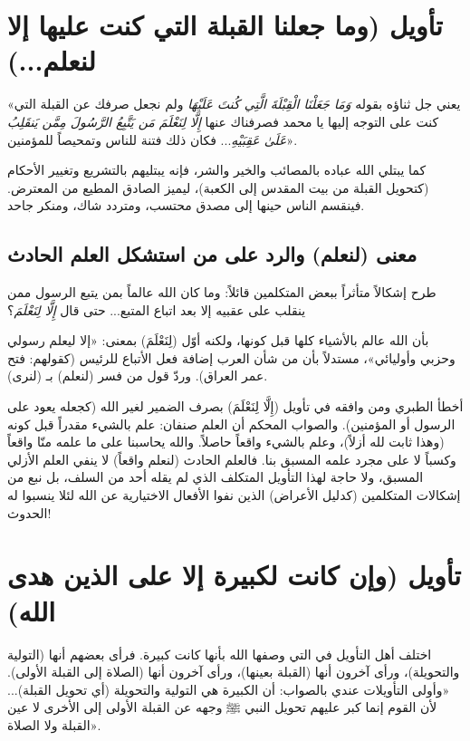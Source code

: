 \separator

\section{تأويل (وما جعلنا القبلة التي كنت عليها إلا لنعلم...)}
 «يعني جل ثناؤه بقوله \textit{وَمَا جَعَلْنَا الْقِبْلَةَ الَّتِي كُنتَ عَلَيْهَا} ولم نجعل صرفك عن القبلة التي كنت على التوجه إليها يا محمد فصرفناك عنها \textit{إِلَّا لِنَعْلَمَ مَن يَتَّبِعُ الرَّسُولَ مِمَّن يَنقَلِبُ عَلَىٰ عَقِبَيْهِ}... فكان ذلك فتنة للناس وتمحيصاً للمؤمنين».

\begin{fawaid}
كما يبتلي الله عباده بالمصائب والخير والشر، فإنه يبتليهم بالتشريع وتغيير الأحكام (كتحويل القبلة من بيت المقدس إلى الكعبة)، ليميز الصادق المطيع من المعترض. فينقسم الناس حينها إلى مصدق محتسب، ومتردد شاك، ومنكر جاحد.
\end{fawaid}

\subsection{معنى (لنعلم) والرد على من استشكل العلم الحادث}
طرح  إشكالاً متأثراً ببعض المتكلمين قائلاً:  وما كان الله عالماً بمن يتبع الرسول ممن ينقلب على عقبيه إلا بعد اتباع المتبع... حتى قال \textit{إِلَّا لِنَعْلَمَ}؟

 بأن الله عالم بالأشياء كلها قبل كونها، ولكنه أوّل (لِنَعْلَمَ) بمعنى: «إلا ليعلم رسولي وحزبي وأوليائي»، مستدلاً بأن من شأن العرب إضافة فعل الأتباع للرئيس (كقولهم: فتح عمر العراق). وردّ قول من فسر (لنعلم) بـ (لنرى).

\begin{fawaid}
أخطأ الطبري ومن وافقه في تأويل (إِلَّا لِنَعْلَمَ) بصرف الضمير لغير الله (كجعله يعود على الرسول أو المؤمنين). والصواب المحكم أن العلم صنفان: علم بالشيء مقدراً قبل كونه (وهذا ثابت لله أزلاً)، وعلم بالشيء واقعاً حاصلاً. والله يحاسبنا على ما علمه منّا واقعاً وكسباً لا على مجرد علمه المسبق بنا. فالعلم الحادث (لنعلم واقعاً) لا ينفي العلم الأزلي المسبق، ولا حاجة لهذا التأويل المتكلف الذي لم يقله أحد من السلف، بل نبع من إشكالات المتكلمين (كدليل الأعراض) الذين نفوا الأفعال الاختيارية عن الله لئلا ينسبوا له الحدوث!
\end{fawaid}

\separator

\section{تأويل (وإن كانت لكبيرة إلا على الذين هدى الله)}
اختلف أهل التأويل في التي وصفها الله بأنها كانت كبيرة. فرأى بعضهم أنها (التولية والتحويلة)، ورأى آخرون أنها (القبلة بعينها)، ورأى آخرون أنها (الصلاة إلى القبلة الأولى).
 «وأولى التأويلات عندي بالصواب: أن الكبيرة هي التولية والتحويلة (أي تحويل القبلة)... لأن القوم إنما كبر عليهم تحويل النبي ﷺ وجهه عن القبلة الأولى إلى الأخرى لا عين القبلة ولا الصلاة».

